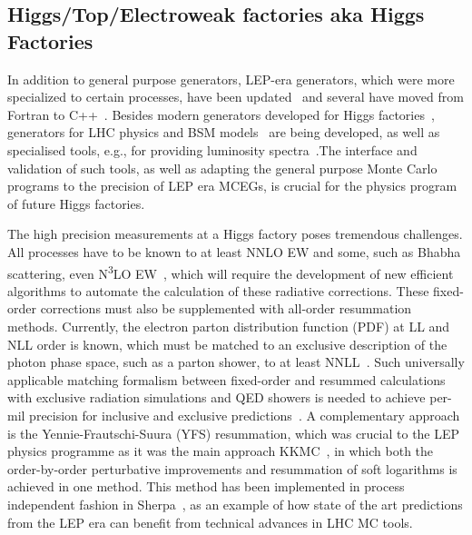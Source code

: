 \documentclass[10pt,a4paper]{article}
\begin{document}
\subsection{Higgs/Top/Electroweak factories aka Higgs
Factories}\label{higgstopelectroweak-factories-aka-higgs-factories}

In addition to general purpose generators, LEP-era generators, which were more
specialized to certain processes, have been
updated~\cite{Jadach:1999vf,CarloniCalame:2003yt,Jadach:1991by,Denner:2000bj}
and several have moved from Fortran to C++~\cite{Jadach:2022mbe, Sjostrand:2014zea}.
Besides modern generators developed for Higgs factories~\cite{Kilian:2007gr, Sherpa:2024mfk},
generators for LHC physics and  BSM models~\cite{Frixione:2021zdp,Sherpa:2019gpd}
are being developed, as well as specialised tools,
e.g., for providing luminosity spectra~\cite{Ohl:1996fi}.The
interface and validation of such tools, as well as adapting the general purpose
Monte Carlo programs to the precision of LEP era MCEGs, is crucial for the
physics program of future Higgs factories.

The high precision measurements at a Higgs factory poses tremendous challenges.
All processes have to be known to at least NNLO EW and
some, such as Bhabha scattering, even N\textsuperscript{3}LO
EW~\cite{ECFAHiggsStudy:2025}, which will require the development of new
efficient algorithms to automate the calculation of these radiative corrections.
These fixed-order corrections must also be supplemented with all-order
resummation methods. Currently, the electron parton distribution function (PDF)
at LL and NLL order is known, which must be matched to an exclusive description
of the photon phase space, such as a parton shower, to at least
NNLL~\cite{ECFAHiggsStudy:2025,Bertone:2019hks,Frixione:2019lga}. Such
universally applicable matching formalism between fixed-order and resummed
calculations with exclusive radiation simulations and QED showers is needed to
achieve per-mil precision for inclusive and exclusive
predictions~\cite{Frixione:2022ofv}. A complementary approach is the
Yennie-Frautschi-Suura (YFS) resummation, which was crucial to the LEP physics
programme as it was the main approach KKMC~\cite{Jadach:1999vf}, in which both
the order-by-order perturbative improvements and resummation of soft logarithms
is achieved in one method. This method has been implemented in process
independent fashion in Sherpa~\cite{Krauss:2022ajk}, as an example of how state
of the art predictions from the LEP era can benefit from technical advances in
LHC MC tools.
\end{document}
